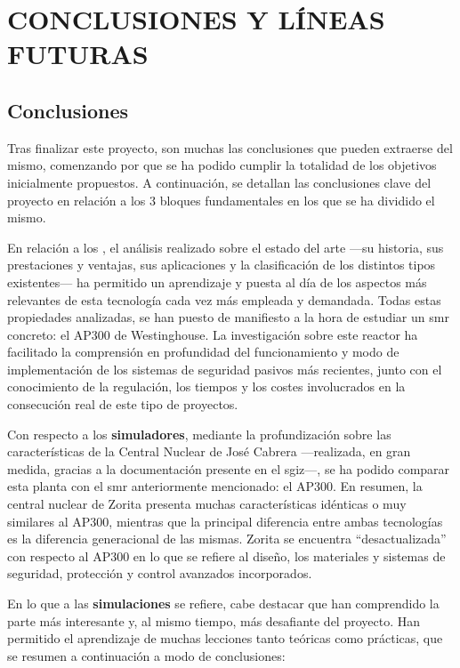 \newpage
\section{CONCLUSIONES Y LÍNEAS FUTURAS} \label{conclusiones}

\subsection{Conclusiones}

Tras finalizar este proyecto, son muchas las conclusiones que pueden extraerse del mismo, comenzando por que se ha podido cumplir la totalidad de los objetivos inicialmente propuestos. A continuación, se detallan las conclusiones clave del proyecto en relación a los 3 bloques fundamentales en los que se ha dividido el mismo.

En relación a los \textbf{}, el análisis realizado sobre el estado del arte ---su historia, sus prestaciones y ventajas, sus aplicaciones y la clasificación de los distintos tipos existentes--- ha permitido un aprendizaje y puesta al día de los aspectos más relevantes de esta tecnología cada vez más empleada y demandada. Todas estas propiedades analizadas, se han puesto de manifiesto a la hora de estudiar un \acrlong{smr} concreto: el AP300 de Westinghouse. La investigación sobre este reactor ha facilitado la comprensión en profundidad del funcionamiento y modo de implementación de los sistemas de seguridad pasivos más recientes, junto con el conocimiento de la regulación, los tiempos y los costes involucrados en la consecución real de este tipo de proyectos.

Con respecto a los \textbf{simuladores}, mediante la profundización sobre las características de la Central Nuclear de José Cabrera ---realizada, en gran medida, gracias a la documentación presente en el \acrshort{sgiz}---, se ha podido comparar esta planta con el \acrshort{smr} anteriormente mencionado: el AP300. En resumen, la central nuclear de Zorita presenta muchas características idénticas o muy similares al AP300, mientras que la principal diferencia entre ambas tecnologías es la diferencia generacional de las mismas. Zorita se encuentra ``desactualizada'' con respecto al AP300 en lo que se refiere al diseño, los materiales y sistemas de seguridad, protección y control avanzados incorporados.

En lo que a las \textbf{simulaciones} se refiere, cabe destacar que han comprendido la parte más interesante y, al mismo tiempo, más desafiante del proyecto. Han permitido el aprendizaje de muchas lecciones tanto teóricas como prácticas, que se resumen a continuación a modo de conclusiones:

